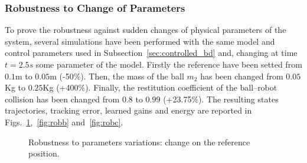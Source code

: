 \subsubsection{Robustness to Change of Parameters}
%
To prove the robustness against sudden changes of physical parameters of the system, several simulations have been performed with the same model and control parameters used in Subsection~\ref{sec:controlled_bd} and, changing at time $t = 2.5s$ some parameter of the model. Firstly the reference have been setted from $0.1$m to $0.05$m (-50\%). Then, the mass of the ball $m_2$ has been changed from $0.05$Kg to $0.25$Kg (+400\%). Finally, the restitution coefficient of the ball--robot collision has been changed from $0.8$ to $0.99$ (+23.75\%). The resulting states trajectories, tracking error, learned gains and energy are reported in Figs.~\ref{fig:roba},~\ref{fig:robb} and~\ref{fig:robc}.
% 
\begin{figure}[!ht]
	\centering
	\caption[Robustness to parameters variations: reference position]{Robustness to parameters variations: change on the reference position.}
	\label{fig:roba}
\end{figure}
